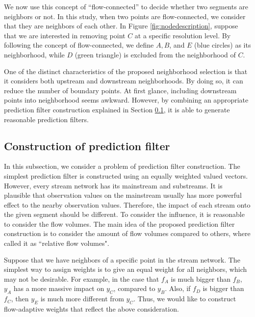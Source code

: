 \documentclass[11pt,titlepage]{article}
\begin{document}
We now use this concept of ``flow-connected'' to decide whether two segments are neighbors or not. In this study, when two points are flow-connected, we consider that they are neighbors of each other.  In Figure \ref{fig:nodedescription}, suppose that we are interested in removing point $C$ at a specific resolution level. By following the concept of flow-connected, we define $A, B$, and $E$ (blue circles) as  its neighborhood, while $D$ (green triangle) is excluded from the neighborhood of $C$.

One of the distinct characteristics of the proposed neighborhood selection is that it considers both upstream and downstream neighborhoods. By doing so, it can reduce the number of boundary points. At first glance, including downstream points into neighborhood seems awkward. However, by combining an appropriate prediction filter construction explained in Section \ref{subsec:pf}, it is able to generate reasonable prediction filters.

\subsection{Construction of prediction filter }\label{subsec:pf}

In this subsection, we consider a problem of prediction filter construction. The simplest prediction filter is constructed using an equally weighted valued vectors. However, every stream network has its mainstream and substreams. It is plausible that observation values on the mainstream usually has more powerful effect to the nearby observation values. Therefore, the impact of each stream onto the given segment should be different. To consider the influence, it is reasonable to consider the flow volumes.
The main idea of the proposed prediction filter construction is to consider the amount of flow volumes compared to others, where \cite{ODonnell2014} called it as ``relative flow volumes".

Suppose that we have neighbors of a specific point in the stream network. The simplest way to assign weights is to give an equal weight for all neighbors, which may not be desirable. For example, in the case that $f_A$ is much bigger than $f_B$,  $y_A$ has a more massive impact on $y_C$, compared to $y_B$. Also, if $f_D$ is bigger than $f_C$, then $y_E$ is much more different from $y_C$. Thus, we would like to construct flow-adaptive weights that reflect the above consideration. 
\end{document}
